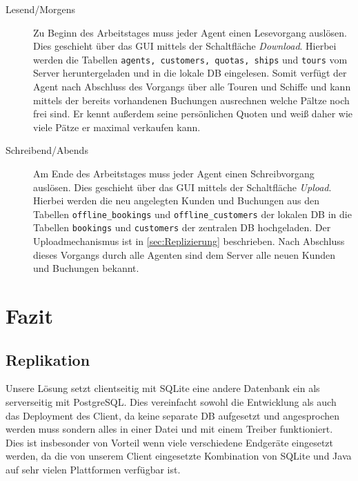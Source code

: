 \documentclass[12pt,a4paper,ngerman,english]{report}
\begin{document}
\begin{description}
\item[Lesend/Morgens] Zu Beginn des Arbeitstages muss jeder Agent einen Lesevorgang auslösen. Dies geschieht über das GUI mittels der Schaltfläche \emph{Download}. Hierbei werden die Tabellen \texttt{agents, customers, quotas, ships} und \texttt{tours} vom Server heruntergeladen und in die lokale DB eingelesen. Somit verfügt der Agent nach Abschluss des Vorgangs über alle Touren und Schiffe und kann mittels der bereits vorhandenen Buchungen ausrechnen welche Pältze noch frei sind. Er kennt außerdem seine persönlichen Quoten und weiß daher wie viele Pätze er maximal verkaufen kann.
\item[Schreibend/Abends] Am Ende des Arbeitstages muss jeder Agent einen Schreibvorgang auslösen. Dies geschieht über das GUI mittels der Schaltfläche \emph{Upload}. Hierbei werden die neu angelegten Kunden und Buchungen aus den Tabellen \texttt{offline\_bookings} und \texttt{offline\_customers} der lokalen DB in die Tabellen \texttt{bookings} und \texttt{customers} der zentralen DB hochgeladen. Der Uploadmechanismus ist in \autoref{sec:Replizierung} beschrieben. Nach Abschluss dieses Vorgangs durch alle Agenten sind dem Server alle neuen Kunden und Buchungen bekannt. 
\end{description}

\chapter{Fazit}

\section{Replikation}
\label{sec:FazitRepl}

Unsere Lösung setzt clientseitig mit SQLite eine andere Datenbank ein als serverseitig mit PostgreSQL. Dies vereinfacht sowohl die Entwicklung als auch das Deployment des Client, da keine separate DB aufgesetzt und angesprochen werden muss sondern alles in einer Datei und mit einem Treiber funktioniert. Dies ist insbesonder von Vorteil wenn viele verschiedene Endgeräte eingesetzt werden, da die von unserem Client eingesetzte Kombination von SQLite und Java auf sehr vielen Plattformen verfügbar ist.\\
\end{document}
